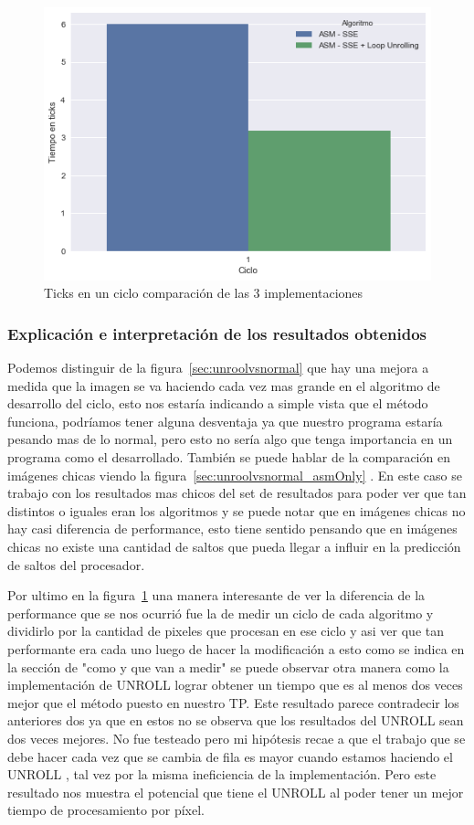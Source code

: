 \begin{figure}[H]
\centering
\includegraphics[scale=0.5]{img/fourCombine_ticks_en_ciclo.png}
\caption{Ticks en un ciclo comparación de las 3 implementaciones}
\label{sec:ticksciclo}
\end{figure}

\subsubsection*{Explicación e interpretación de los resultados obtenidos}
Podemos distinguir de la figura~\ref{sec:unroolvsnormal} que hay una mejora a medida que la imagen se va haciendo cada vez mas grande en el algoritmo de desarrollo del ciclo, esto nos estaría indicando a simple vista que el método funciona, podríamos tener alguna desventaja ya que nuestro programa estaría pesando mas de lo normal, pero esto no sería algo que tenga importancia en un programa como el desarrollado. También se puede hablar de la comparación en imágenes chicas viendo la figura~\ref{sec:unroolvsnormal_asmOnly} . En este caso se trabajo con los resultados mas chicos del set de resultados para poder ver que tan distintos o iguales eran los algoritmos y se puede notar que en imágenes chicas no hay casi diferencia de performance, esto tiene sentido pensando que en imágenes chicas no existe una cantidad de saltos que pueda llegar a influir en la predicción de saltos del procesador.

Por ultimo en la figura~\ref{sec:ticksciclo} una manera interesante de ver la diferencia de la performance que se nos ocurrió fue la de medir un ciclo de cada algoritmo y dividirlo por la cantidad de pixeles que procesan en ese ciclo y asi ver que tan performante era cada uno luego de hacer la modificación a esto como se indica en la sección de "como y que van a medir" se puede observar otra manera como la implementación de UNROLL lograr obtener un tiempo que es al menos dos veces mejor que el método puesto en nuestro TP. Este resultado parece contradecir los anteriores dos ya que en estos no se observa que los resultados del UNROLL sean dos veces mejores. No fue testeado pero mi hipótesis recae a que el trabajo que se debe hacer cada vez que se cambia de fila es mayor cuando estamos haciendo el UNROLL , tal vez por la misma ineficiencia de la implementación. Pero este resultado nos muestra el potencial que tiene el UNROLL al poder tener un mejor tiempo de procesamiento por píxel.

